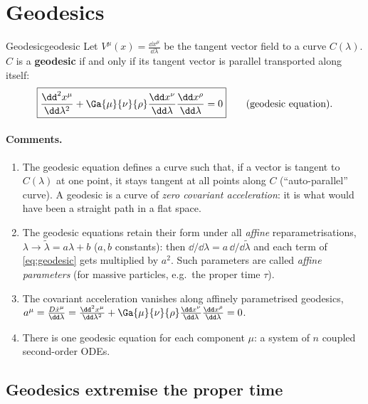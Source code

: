 \section{Geodesics}

\begin{definition}{Geodesic}{geodesic}
Let $V^\mu(x)=\frac{\dd x^\mu}{\dd\lambda}$ be the tangent vector field to a curve $C(\lambda)$. $C$ is a \textbf{geodesic} if and only if its tangent vector is parallel transported along itself:
\begin{equation}
  \boxed{\frac{\dd^2x^\mu}{\dd\lambda^2}+\Ga{\mu}{\nu}{\rho}\frac{\dd x^\nu}{\dd\lambda}\frac{\dd x^\rho}{\dd\lambda}=0}\qquad\text{(geodesic equation)}.
  \label{eq:geodesic}
\end{equation}
\end{definition}
\paragraph{Comments.}
\begin{enumerate}
\item The geodesic equation defines a curve such that, if a vector is tangent to $C(\lambda)$ at one point, it stays tangent at all points along $C$ (``auto-parallel'' curve). A geodesic is a curve of \emph{zero covariant acceleration}: it is what would have been a straight path in a flat space.
\item The geodesic equations retain their form under all \emph{affine} reparametrisations, $\lambda\to\tilde\lambda=a\lambda+b$ ($a,b$ constants): then $\dd/\dd\lambda=a\,\dd/\dd\tilde\lambda$ and each term of \eqref{eq:geodesic} gets multiplied by $a^2$. Such parameters are called \emph{affine parameters} (for massive particles, e.g.\ the proper time $\tau$).
\item The covariant acceleration vanishes along affinely parametrised geodesics, $a^\mu=\frac{D\dot x^\mu}{\dd\lambda}=\frac{\dd^2x^\mu}{\dd\lambda^2}+\Ga{\mu}{\nu}{\rho}\frac{\dd x^\nu}{\dd\lambda}\frac{\dd x^\rho}{\dd\lambda}=0$.
\item There is one geodesic equation for each component $\mu$: a system of $n$ coupled second-order ODEs.
\end{enumerate}

\subsection{Geodesics extremise the proper time}

